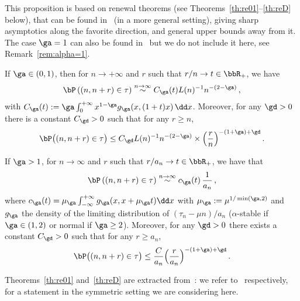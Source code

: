 \begin{appendix}
This proposition is based on renewal theorems (see Theorems~\ref{th:re01}--\ref{th:reD} below), that can be found in~\cite{cf:B} (in a more general setting), giving sharp asymptotics along the favorite direction, and general upper bounds away from it. The case $\ga=1$ can also be found in~\cite{cf:B} but we do not include it here, see Remark~\ref{rem:alpha=1}.


\begin{theo}\label{th:re01}
If $\ga \in (0,1)$, then for $n\to+\infty $ and $r$ such that $r/n \to t \in \bbR_+$, we have
\begin{equation}\label{eq:D01}
\bP \left((n,n+r) \in \tau \right) \stackrel{n \to \infty}\sim C_{\ga}(t) L(n)^{-1} n^{-(2-\ga)}\,,
\end{equation}
with $C_{\ga}(t) := \ga \int_{0}^{+ \infty} x^{1- \ga} g_\ga (x, (1+t) x)\,\dd x$. Moreover, for any $\gd>0$ there is a constant $C_{\gd}>0$ such that for any $r\geq n$,
\begin{equation}
\bP\big((n,n+r)\in\tau \big) \leq C_{\gd} L(n)^{-1} n^{-(2-\ga)} \times \Big(\frac{r}{n} \Big)^{-(1+\ga) +\gd}\,.
\end{equation}
\end{theo}



\begin{theo}\label{th:reD}
If $\ga> 1$, for $n \to \infty$ and $r$ such that $r/a_n \to t \in \bbR_+$, we have that
\begin{equation}
\bP \left((n,n+r) \in \tau \right) \stackrel{n \to \infty}\sim c_{\ga}(t)\,\frac{1}{a_n}\,,
\end{equation}
where $c_{\ga}(t) = \mu_\ga \int_{- \infty}^{+ \infty} g_\ga (x,x+\mu_\ga t) \dd x$ with $\mu_\ga := \mu^{1/\min(\ga,2)}$ and $g_{\ga}$ the density of the limiting distribution of $(\tau_n -\mu n)/a_n$ ($\alpha$-stable if $\ga\in(1,2)$ or normal if $\ga\geq 2$). Moreover, for any $\gd>0$ there exists a constant $C_{\gd}>0$ such that for any $r\geq a_n$,
\begin{equation}\label{eq:offdiag}
\bP\big((n, n+r) \in \tau \big) \leq \frac{C}{a_n} \Big(\frac{r}{a_n} \Big)^{-(1+\ga) +\gd}\,.
\end{equation}
\end{theo}

Theorems~\ref{th:re01} and~\ref{th:reD} are extracted from~\cite[Theorems~3.1, 4.1 and Theorems~3.3, 4.2 respectively]{cf:B}: we refer to~\cite[Equations~(3.4), (4.2), (3.7), (4.5)]{cf:B} respectively, for a statement in the symmetric setting we are considering here.
\\[-0.5em]


\end{appendix}
